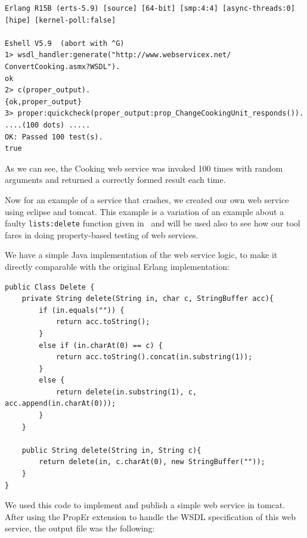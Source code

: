 \documentclass[submission,copyright,a4]{eptcs}
\begin{document}
\begin{lstlisting}
Erlang R15B (erts-5.9) [source] [64-bit] [smp:4:4] [async-threads:0] [hipe] [kernel-poll:false]

Eshell V5.9  (abort with ^G)
1> wsdl_handler:generate("http://www.webservicex.net/
ConvertCooking.asmx?WSDL").
ok
2> c(proper_output).
{ok,proper_output}
3> proper:quickcheck(proper_output:prop_ChangeCookingUnit_responds()).
....(100 dots) .....
OK: Passed 100 test(s).
true
\end{lstlisting}

As we can see, the Cooking web service was invoked 100 times with random 
arguments and returned a correctly formed result each time.

Now for an example of a service that crashes, we created our own web
service using eclipse and tomcat. This example is a variation of an
example about a faulty \texttt{lists:delete} function given
in~\cite{PropEr@Erlang-11} and will be used also to see how our tool
fares in doing property-based testing of web services.

We have a simple Java implementation of the web service logic, to make it
directly comparable with the original Erlang implementation:

\begin{lstlisting}
public Class Delete {
    private String delete(String in, char c, StringBuffer acc){
        if (in.equals("")) {
            return acc.toString();
        }
        else if (in.charAt(0) == c) {
            return acc.toString().concat(in.substring(1));
        }
        else {
            return delete(in.substring(1), c, acc.append(in.charAt(0)));
        }
    }
    
    public String delete(String in, String c){
        return delete(in, c.charAt(0), new StringBuffer(""));
    } 
}
\end{lstlisting}

We used this code to implement and publish a simple web service in tomcat. 
After using the PropEr extension to handle the WSDL specification of this 
web service, the output file was the following:
\end{document}
